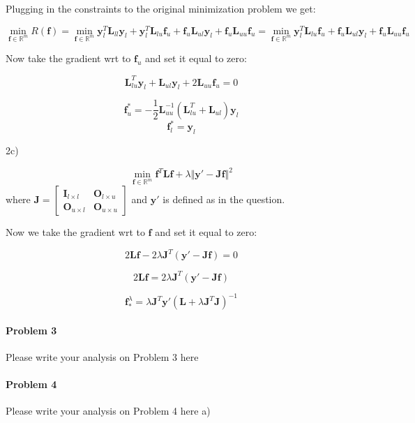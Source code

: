 \documentclass[12pt]{report}
\begin{document}
Plugging in the constraints to the original minimization problem we get:

$$ \underset{\mathbf{f} \in \mathbb{R}^m} {\min} R(\mathbf{f}) = 
\underset{\mathbf{f} \in \mathbb{R}^m} {\min} 
\mathbf{y}^T_l\mathbf{L}_{ll}\mathbf{y}_l
+
\mathbf{y}^T_l\mathbf{L}_{lu}\mathbf{f}_u
+
\mathbf{f}_u\mathbf{L}_{ul}\mathbf{y}_l
+
\mathbf{f}_u\mathbf{L}_{uu}\mathbf{f}_u
=
\underset{\mathbf{f} \in \mathbb{R}^m} {\min}
\mathbf{y}^T_l\mathbf{L}_{lu}\mathbf{f}_u
+
\mathbf{f}_u\mathbf{L}_{ul}\mathbf{y}_l
+
\mathbf{f}_u\mathbf{L}_{uu}\mathbf{f}_u
$$

Now take the gradient wrt to $\mathbf{f}_u$ and set it equal to zero:

$$
\mathbf{L}_{lu}^T\mathbf{y}_l
+
\mathbf{L}_{ul}\mathbf{y}_l
+
2\mathbf{L}_{uu}\mathbf{f}_u = 0
$$


$$
\boxed{
\mathbf{f}^*_{u} = -\frac{1}{2} \mathbf{L}_{uu}^{-1} (\mathbf{L}_{lu}^T+\mathbf{L}_{ul})\mathbf{y}_{l}
}
$$
$$
\boxed{
\mathbf{f}^*_{l} = \mathbf{y}_{l}
}
$$

2c)

\begin{equation}
 \underset{\mathbf{f} \in \mathbb{R}^m} {\min}
 \mathbf{f}^T\mathbf{L}\mathbf{f}
+ \lambda
%
\Vert \mathbf{y'} - \mathbf{J} \mathbf{f} \Vert^2
%
\end{equation}
where $ \mathbf{J} = \begin{bmatrix} \mathbf{I}_{l \times l} & \mathbf{O}_{l \times u} \\ \mathbf{O}_{u \times l} & \mathbf{O}_{u \times u} \end{bmatrix}$ and $\mathbf{y'}$ is defined as in the question.

Now we take the gradient wrt to $\mathbf{f}$ and set it equal to zero:

$$2\mathbf{L}\mathbf{f} - 2 \lambda \mathbf{J}^T(\mathbf{y'} -\mathbf{J}\mathbf{f}) = 0$$

$$2\mathbf{L}\mathbf{f} = 2 \lambda \mathbf{J}^T(\mathbf{y'} -\mathbf{J}\mathbf{f})$$

$$\mathbf{f}_*^{\lambda} = \lambda \mathbf{J}^T\mathbf{y'}( \mathbf{L}+ \lambda \mathbf{J}^T \mathbf{J} )^{-1} $$


\paragraph{Problem 3}
Please write your analysis on Problem 3 here


\paragraph{Problem 4}
Please write your analysis on Problem 4 here
a)
\end{document}
